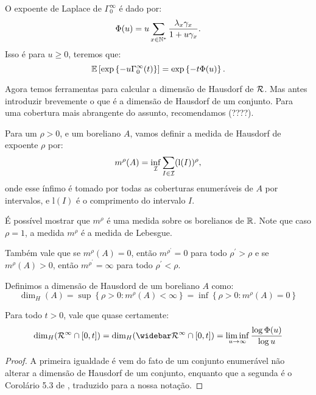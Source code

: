 \begin{proposicao}
  O expoente de Laplace de $\Gamma^\infty_0$ é dado por:
  \begin{displaymath}
    \Phi(u) = u \sum_{x \in {\mathbb{N^*}}} \frac{\lambda_x \gamma_x}{1 + u\gamma_x}.
  \end{displaymath}
  Isso é para $u \geq 0$, teremos que:
  \begin{displaymath}
    {\mathbb{E}} \left[
      \exp \left\{
        -u \Gamma^\infty_0 (t)
      \right\}
    \right] = 
    \exp\left\{
      -t \Phi(u)
    \right\}.
  \end{displaymath}
\end{proposicao}


Agora temos ferramentas para calcular a dimensão de Hausdorf de
${\mathcal{R}}$. Mas antes introduzir brevemente o que é a dimensão de Hausdorf
de um conjunto. Para uma cobertura mais abrangente do assunto,
recomendamos (????).

Para um $\rho > 0$, e um boreliano $A$, vamos definir a medida de
Hausdorf de expoente $\rho$ por:
\begin{displaymath}
  m^\rho(A) = \inf_{{\mathcal{I}}} \sum_{I \in {\mathcal{I}}} (\mathrm{l}(I))^\rho, 
\end{displaymath}
onde esse ínfimo é tomado por todas as coberturas enumeráveis de $A$
por intervalos, e $\mathrm{l}(I)$ é o comprimento do intervalo $I$.

É possível mostrar que $m^\rho$ é uma medida sobre os borelianos de
${\mathbb{R}}$. Note que caso $\rho = 1$, a medida $m^\rho$ é a medida de
Lebesgue.

Também vale que se $m^\rho(A) = 0$, então $m^{\rho^\prime} = 0$ para
todo $\rho^\prime > \rho$ e se $m^\rho(A) > 0$, então $m^{\rho^\prime}
= \infty$ para todo $\rho^\prime < \rho$.


\begin{definicao}
  Definimos a dimensão de Hausdord de um boreliano $A$ como:
  \begin{displaymath}
    \dim_H(A) = \sup \left\{ \rho > 0 : m^\rho(A) < \infty \right\}
    = \inf \left\{ \rho > 0: m^\rho(A) = 0 \right\}
  \end{displaymath}
\end{definicao}

\begin{teorema}
  Para todo $t > 0$, vale que quase certamente:
  \begin{displaymath}
    \dim_H(\RR^\infty \cap [0, t]) = 
    \dim_H(\RRb^\infty \cap [0, t]) =
    \liminf_{u \to \infty} \frac{\log \Phi(u)}{\log u}
  \end{displaymath}
\end{teorema}
\begin{proof}
  A primeira igualdade é vem do fato de um conjunto enumerável não
  alterar a dimensão de Hausdorf de um conjunto, enquanto que a
  segunda é o Corolário 5.3 de \cite{bertoin:97}, traduzido para a
  nossa notação.
\end{proof}

